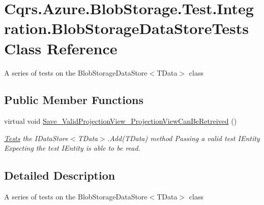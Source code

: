 \hypertarget{classCqrs_1_1Azure_1_1BlobStorage_1_1Test_1_1Integration_1_1BlobStorageDataStoreTests}{}\section{Cqrs.\+Azure.\+Blob\+Storage.\+Test.\+Integration.\+Blob\+Storage\+Data\+Store\+Tests Class Reference}
\label{classCqrs_1_1Azure_1_1BlobStorage_1_1Test_1_1Integration_1_1BlobStorageDataStoreTests}


A series of tests on the Blob\+Storage\+Data\+Store$<$\+T\+Data$>$ class  


\subsection*{Public Member Functions}
\begin{DoxyCompactItemize}
\item 
virtual void \hyperlink{classCqrs_1_1Azure_1_1BlobStorage_1_1Test_1_1Integration_1_1BlobStorageDataStoreTests_a14f230934464191e0af7aad552200cc0_a14f230934464191e0af7aad552200cc0}{Save\+\_\+\+Valid\+Projection\+View\+\_\+\+Projection\+View\+Can\+Be\+Retreived} ()
\begin{DoxyCompactList}\small\item\em \hyperlink{namespaceCqrs_1_1Tests}{Tests} the I\+Data\+Store$<$\+T\+Data$>$.\+Add(\+T\+Data) method Passing a valid test I\+Entity Expecting the test I\+Entity is able to be read. \end{DoxyCompactList}\end{DoxyCompactItemize}


\subsection{Detailed Description}
A series of tests on the Blob\+Storage\+Data\+Store$<$\+T\+Data$>$ class 



